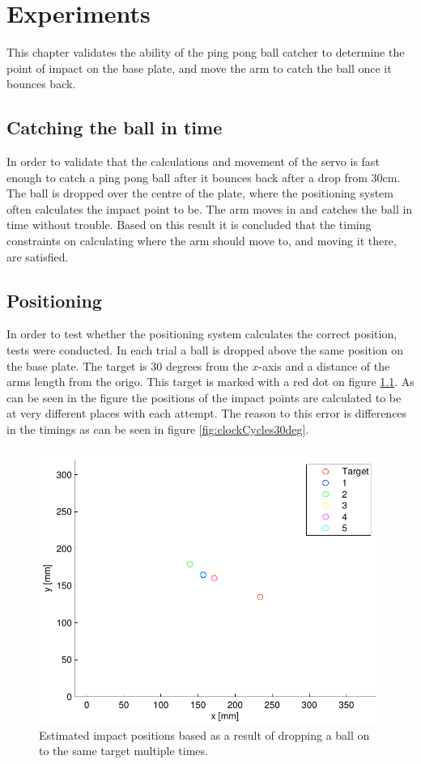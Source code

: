\chapter{Experiments} %
\label{chap:experiments}
This chapter validates the ability of the ping pong ball catcher to determine the point of impact on the base plate, and move the arm to catch the ball once it bounces back.

\section{Catching the ball in time}
In order to validate that the calculations and movement of the servo is fast enough to catch a ping pong ball after it bounces back after a drop from $30\si{\centi\meter}$.
The ball is dropped over the centre of the plate, where the positioning system often calculates the impact point to be.
The arm moves in and catches the ball in time without trouble.
Based on this result it is concluded that the timing constraints on calculating where the arm should move to, and moving it there, are satisfied.

\section{Positioning}
In order to test whether the positioning system calculates the correct position, tests were conducted.
In each trial a ball is dropped above the same position on the base plate.
The target is 30 degrees from the $x$-axis and a distance of the arms length from the origo.
This target is marked with a red dot on figure \ref{fig:testRes30deg}.
As can be seen in the figure the positions of the impact points are calculated to be at very different places with each attempt. The reason to this error is differences in the timings as can be seen in figure \ref{fig:clockCycles30deg}.
\begin{figure}[htb]
	\centering
	\includegraphics[width=.8\textwidth]{figures/testRes30deg.pdf}
	\caption{Estimated impact positions based as a result of dropping a ball on to the same target multiple times.}
	\label{fig:testRes30deg}
\end{figure}

